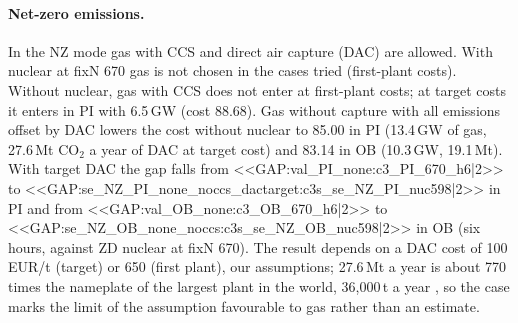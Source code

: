 \begin{table}[htbp]
\centering
\caption{Small modular reactors with large nuclear off, six hours, four years, imports with a capacity credit. SMR fixN with a 5-year build, 60-year life, $r=5\%$.}\label{tab:smr}

\end{table}

\paragraph{Net-zero emissions.} In the NZ mode gas with CCS and direct air capture (DAC) are allowed. With nuclear at fixN 670 gas is not chosen in the cases tried (first-plant costs). Without nuclear, gas with CCS does not enter at first-plant costs; at target costs it enters in PI with 6.5\,GW (cost 88.68). Gas without capture with all emissions offset by DAC lowers the cost without nuclear to 85.00 in PI (13.4\,GW of gas, 27.6\,Mt CO$_2$ a year of DAC at target cost) and 83.14 in OB (10.3\,GW, 19.1\,Mt). With target DAC the gap falls from <<GAP:val_PI_none:c3_PI_670_h6|2>> to <<GAP:se_NZ_PI_none_noccs_dactarget:c3s_se_NZ_PI_nuc598|2>> in PI and from <<GAP:val_OB_none:c3_OB_670_h6|2>> to <<GAP:se_NZ_OB_none_noccs:c3s_se_NZ_OB_nuc598|2>> in OB (six hours, against ZD nuclear at fixN 670). The result depends on a DAC cost of 100\,EUR/t (target) or 650 (first plant), our assumptions; 27.6\,Mt a year is about 770 times the nameplate of the largest plant in the world, 36{,}000\,t a year \citep{Climeworks2026}, so the case marks the limit of the assumption favourable to gas rather than an estimate.

\begin{table}[htbp]
\centering
\caption{NZ variants, six hours, four years, imports with a capacity credit.}\label{tab:nz}

\end{table}

